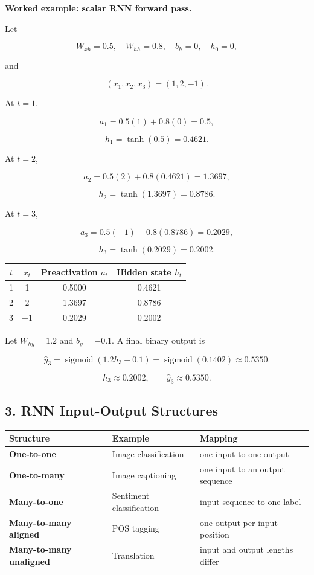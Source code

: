\documentclass[11pt,a4paper,twoside]{article}
\newcommand{\sigmoid}{\operatorname{sigmoid}}
\begin{document}
\textbf{Worked example: scalar RNN forward pass.}

Let

\[
W_{xh}=0.5,\quad W_{hh}=0.8,\quad b_h=0,\quad h_0=0,
\]

and

\[
(x_1,x_2,x_3)=(1,2,-1).
\]

At $t=1$,

\[
a_1=0.5(1)+0.8(0)=0.5,
\]

\[
h_1=\tanh(0.5)=0.4621.
\]

At $t=2$,

\[
a_2=0.5(2)+0.8(0.4621)=1.3697,
\]

\[
h_2=\tanh(1.3697)=0.8786.
\]

At $t=3$,

\[
a_3=0.5(-1)+0.8(0.8786)=0.2029,
\]

\[
h_3=\tanh(0.2029)=0.2002.
\]

\begin{center}
\begin{tabular}{c|c|c|c}
\toprule
$t$&$x_t$&Preactivation $a_t$&Hidden state $h_t$\\ \midrule
1&1&0.5000&0.4621\\
2&2&1.3697&0.8786\\
3&$-1$&0.2029&0.2002\\ \bottomrule
\end{tabular}
\end{center}

Let $W_{hy}=1.2$ and $b_y=-0.1$. A final binary output is

\[
\hat y_3=\sigmoid(1.2h_3-0.1)
=\sigmoid(0.1402)
\approx0.5350.
\]

\[
\boxed{h_3\approx0.2002,\qquad\hat y_3\approx0.5350.}
\]

\subsection*{3. RNN Input-Output Structures}

\begin{center}
\begin{tabularx}{0.97\textwidth}{>{\bfseries}p{3.3cm}XX}
\toprule
Structure&Example&Mapping\\ \midrule
One-to-one&Image classification&one input to one output\\
One-to-many&Image captioning&one input to an output sequence\\
Many-to-one&Sentiment classification&input sequence to one label\\
Many-to-many aligned&POS tagging&one output per input position\\
Many-to-many unaligned&Translation&input and output lengths differ\\ \bottomrule
\end{tabularx}
\end{center}
\end{document}
